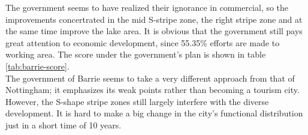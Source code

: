 The government seems to have realized their ignorance in commercial, so the improvements concertrated in the mid S-stripe zone, the right stripe zone and at the same time improve the lake area.
It is obvious that the government still pays great attention to economic development, since 55.35\% efforts are made to working area.
The score under the government's plan is shown in table \ref{tab:barrie-score}.
\\
The government of Barrie seems to take a very different approach from that of Nottingham; it emphasizes its weak points rather than becoming a tourism city.
However, the S-shape stripe zones still largely interfere with the diverse development.
It is hard to make a big change in the city's functional distribution just in a short time of 10 years.



\printbibliography


